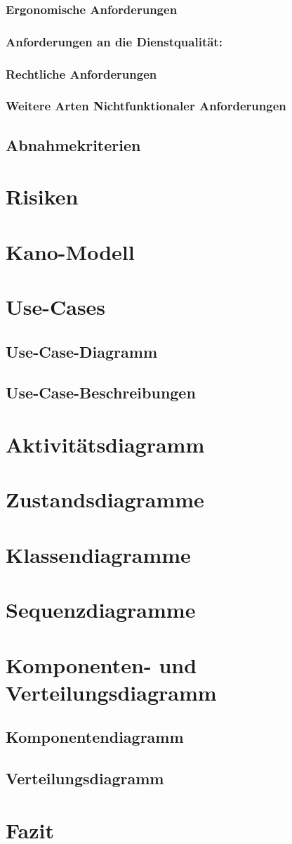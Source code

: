 \documentclass[a4paper, 12pp]{article}
\begin{document}
\subsubsection{Ergonomische Anforderungen}
\subsubsection{Anforderungen an die Dienstqualität:}
\subsubsection{Rechtliche Anforderungen}
\subsubsection{Weitere Arten Nichtfunktionaler Anforderungen}
\subsection{Abnahmekriterien}
\newpage
\section{Risiken}
\section{Kano-Modell}
\section{Use-Cases}
\subsection{Use-Case-Diagramm}
\subsection{Use-Case-Beschreibungen}
\section{Aktivitätsdiagramm}
\section{Zustandsdiagramme}
\section{Klassendiagramme}
\section{Sequenzdiagramme}
\section{Komponenten- und Verteilungsdiagramm}
\subsection{Komponentendiagramm}
\subsection{Verteilungsdiagramm}
\section{Fazit}
\end{document}
